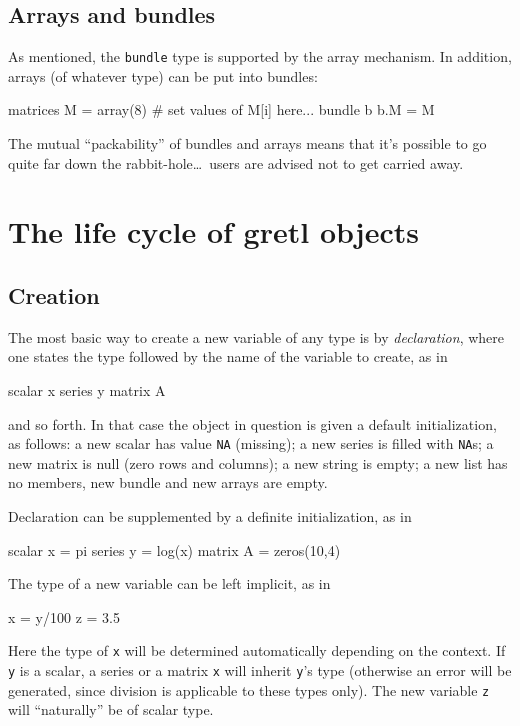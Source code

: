 \subsection{Arrays and bundles}

As mentioned, the \texttt{bundle} type is supported by the array
mechanism. In addition, arrays (of whatever type) can be put into
bundles:
\begin{code}
matrices M = array(8)
# set values of M[i] here...
bundle b
b.M = M
\end{code}

The mutual ``packability'' of bundles and arrays means that it's
possible to go quite far down the rabbit-hole\dots\ users are advised
not to get carried away.

\section{The life cycle of gretl objects}

\subsection{Creation}

The most basic way to create a new variable of any type is by
\textit{declaration}, where one states the type followed by the name
of the variable to create, as in

\begin{code}
scalar x
series y
matrix A
\end{code}

and so forth. In that case the object in question is given a default
initialization, as follows: a new scalar has value \texttt{NA}
(missing); a new series is filled with \texttt{NA}s; a new matrix is
null (zero rows and columns); a new string is empty; a new list has no
members, new bundle and new arrays are empty.

Declaration can be supplemented by a definite initialization, as in

\begin{code}
scalar x = pi
series y = log(x)
matrix A = zeros(10,4)
\end{code}

The type of a new variable can be left implicit, as in
\begin{code}
x = y/100
z = 3.5
\end{code}
Here the type of \texttt{x} will be determined automatically depending
on the context.  If \texttt{y} is a scalar, a series or a matrix
\texttt{x} will inherit \texttt{y}'s type (otherwise an error will be
generated, since division is applicable to these types only). The new
variable \texttt{z} will ``naturally'' be of scalar type.

